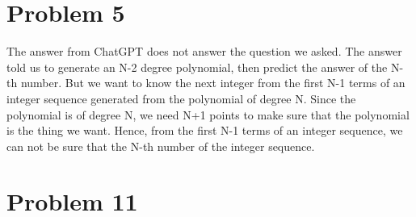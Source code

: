 \documentclass[12pt,a4paper]{article}
\begin{document}
\section*{Problem 5}
The answer from ChatGPT does not answer the question we asked.
The answer told us to generate an N-2 degree polynomial, then predict the answer of the N-th number.
But we want to know the next integer from the first N-1 terms of an integer sequence generated from the polynomial of degree N.
Since the polynomial is of degree N, we need N+1 points to make sure that the polynomial is the thing we want.
Hence, from the first N-1 terms of an integer sequence, we can not be sure that the N-th number of the integer sequence.

\newpage
\section*{Problem 11}    
\end{document}
